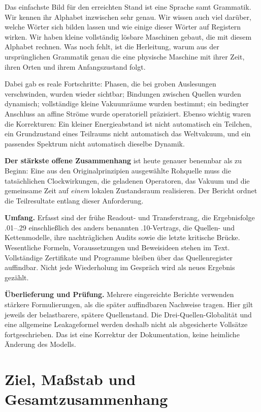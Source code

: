 Das einfachste Bild für den erreichten Stand ist eine Sprache samt Grammatik. Wir kennen ihr Alphabet inzwischen sehr genau. Wir wissen auch viel darüber, welche Wörter sich bilden lassen und wie einige dieser Wörter auf Registern wirken. Wir haben kleine vollständig lösbare Maschinen gebaut, die mit diesem Alphabet rechnen. Was noch fehlt, ist die Herleitung, warum aus der ursprünglichen Grammatik genau die eine physische Maschine mit ihrer Zeit, ihren Orten und ihrem Anfangszustand folgt.

Dabei gab es reale Fortschritte: Phasen, die bei groben Auslesungen verschwinden, wurden wieder sichtbar; Bindungen zwischen Quellen wurden dynamisch; vollständige kleine Vakuumräume wurden bestimmt; ein bedingter Anschluss an affine Ströme wurde operatoriell präzisiert. Ebenso wichtig waren die Korrekturen: Ein kleiner Energieabstand ist nicht automatisch ein Teilchen, ein Grundzustand eines Teilraums nicht automatisch das Weltvakuum, und ein passendes Spektrum nicht automatisch dieselbe Dynamik.

\textbf{Der stärkste offene Zusammenhang} ist heute genauer benennbar als zu Beginn: Eine aus den Originalprinzipien ausgewählte Rohquelle muss die tatsächlichen Clockwirkungen, die geladenen Operatoren, das Vakuum und die gemeinsame Zeit auf \emph{einem} lokalen Zustandsraum realisieren. Der Bericht ordnet die Teilresultate entlang dieser Anforderung.

\textbf{Umfang.} Erfasst sind der frühe Readout- und Transferstrang, die Ergebnisfolge .01--.29 einschließlich des anders benannten .10-Vertrags, die Quellen- und Kettenmodelle, ihre nachträglichen Audits sowie die letzte kritische Brücke. Wesentliche Formeln, Voraussetzungen und Beweisideen stehen im Text. Vollständige Zertifikate und Programme bleiben über das Quellenregister auffindbar. Nicht jede Wiederholung im Gespräch wird als neues Ergebnis gezählt.

\textbf{Überlieferung und Prüfung.} Mehrere eingereichte Berichte verwenden stärkere Formulierungen, als die später auffindbaren Nachweise tragen. Hier gilt jeweils der belastbarere, spätere Quellenstand. Die Drei-Quellen-Globalität und eine allgemeine Leakageformel werden deshalb nicht als abgesicherte Vollsätze fortgeschrieben. Das ist eine Korrektur der Dokumentation, keine heimliche Änderung des Modells.
\tableofcontents
\clearpage
{}
\chapter{Ziel, Maßstab und Gesamtzusammenhang}
